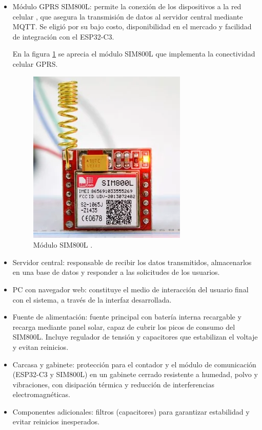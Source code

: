 \begin{itemize}

\item Módulo GPRS SIM800L: permite la conexión de los dispositivos a la red celular \cite{sim800l_datasheet}, que asegura la transmisión de datos al servidor central mediante MQTT. Se eligió por su bajo costo, disponibilidad en el mercado y facilidad de integración con el ESP32-C3.

En la figura \ref{fig:foto_sim800l} se aprecia el módulo SIM800L que implementa la conectividad celular GPRS.

\begin{figure}[H]
  \centering
  \includegraphics[width=0.4\linewidth]{./Figures/fotoSim800l.png}
  \caption{Módulo SIM800L \protect\footnotemark.}
  \label{fig:foto_sim800l}
\end{figure}


\item Servidor central: responsable de recibir los datos transmitidos, almacenarlos en una base de datos y responder a las solicitudes de los usuarios.

\item PC con navegador web: constituye el medio de interacción del usuario final con el sistema, a través de la interfaz desarrollada.

\item Fuente de alimentación: fuente principal con batería interna recargable y recarga mediante panel solar, capaz de cubrir los picos de consumo del SIM800L. Incluye regulador de tensión y capacitores que estabilizan el voltaje y evitan reinicios.

\item Carcasa y gabinete: protección para el contador y el módulo de comunicación (ESP32-C3 y SIM800L) en un gabinete cerrado resistente a humedad, polvo y vibraciones, con disipación térmica y reducción de interferencias electromagnéticas.

\item Componentes adicionales: filtros (capacitores) para garantizar estabilidad y evitar reinicios inesperados.


\end{itemize}






